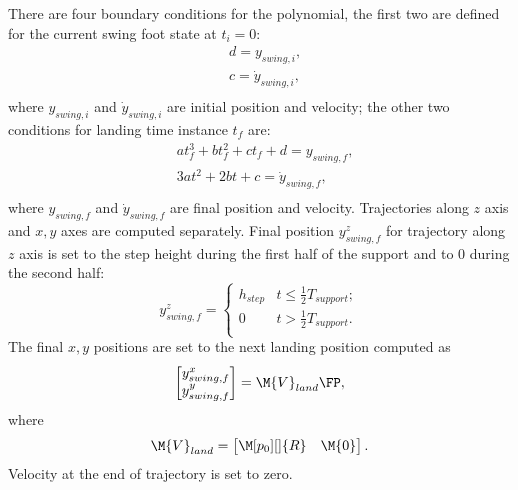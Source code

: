 There are four boundary conditions for the polynomial, the first two are defined for
the current swing foot state at $t_i = 0$:
\begin{equation}\label{wpg04.eq.swtraj_bc1}
\begin{split}
    & d = y_{swing,i}, \\
    & c = \dot{y}_{swing,i}, \\
\end{split}
\end{equation}
where $y_{swing,i}$ and $\dot{y}_{swing,i}$ are initial position and velocity; the other two
conditions for landing time instance $t_f$ are:
\begin{equation}\label{wpg04.eq.swtraj_bc2}
\begin{split}
    & at_f^3 + bt_f^2 + ct_f + d = y_{swing,f},\\
    & 3at^2 + 2bt + c = \dot{y}_{swing,f},\\
\end{split}
\end{equation}
where $y_{swing,f}$ and $\dot{y}_{swing,f}$ are final position and velocity.
Trajectories along $z$ axis and $x,y$ axes are computed separately. Final position
$y_{swing,f}^z$ for trajectory along $z$ axis is set to the step height during the first
half of the support and to $0$ during the second half:
\begin{equation}
    y_{swing,f}^z =
    \left\{
        \begin{array}{ll}
            h_{step}    & t \le \frac{1}{2}T_{support}; \\
            0           & t > \frac{1}{2}T_{support}. \\
        \end{array}
    \right.
\end{equation}
The final $x,y$ positions are set to the next landing position computed as
\begin{equation}
    \begin{bmatrix}
        y_{swing,f}^x\\
        y_{swing,f}^y\\
    \end{bmatrix}
    =
    \M{V}_{land}\FP,
\end{equation}
where
\begin{equation}
    \M{V}_{land} =
    \begin{bmatrix}
        \M[p_0][]{R} & \M{0}
    \end{bmatrix}.
\end{equation}
Velocity at the end of trajectory is set to zero.


